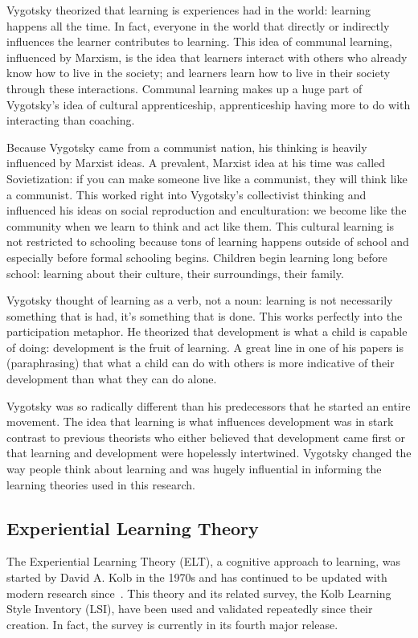 Vygotsky theorized that learning is experiences had in the world: learning happens all the time. In fact, everyone in the world that directly or indirectly influences the learner contributes to learning. This idea of communal learning, influenced by Marxism, is the idea that learners interact with others who already know how to live in the society; and learners learn how to live in their society through these interactions. Communal learning makes up a huge part of Vygotsky's idea of cultural apprenticeship, apprenticeship having more to do with interacting than coaching.

Because Vygotsky came from a communist nation, his thinking is heavily influenced by Marxist ideas. A prevalent, Marxist idea at his time was called Sovietization: if you can make someone live like a communist, they will think like a communist. This worked right into Vygotsky's collectivist thinking and influenced his ideas on social reproduction and enculturation: we become like the community when we learn to think and act like them. This cultural learning is not restricted to schooling because tons of learning happens outside of school and especially before formal schooling begins. Children begin learning long before school: learning about their culture, their surroundings, their family.

Vygotsky thought of learning as a verb, not a noun: learning is not necessarily something that is had, it's something that is done. This works perfectly into the participation metaphor. He theorized that development is what a child is capable of doing: development is the fruit of learning. A great line in one of his papers is (paraphrasing) that what a child can do with others is more indicative of their development than what they can do alone.

Vygotsky was so radically different than his predecessors that he started an entire movement. The idea that learning is what influences development was in stark contrast to previous theorists who either believed that development came first or that learning and development were hopelessly intertwined. Vygotsky changed the way people think about learning and was hugely influential in informing the learning theories used in this research.

\subsection{Experiential Learning Theory}
The Experiential Learning Theory (ELT), a cognitive approach to learning, was started by David A. Kolb in the 1970s and has continued to be updated with modern research since~\citep{kolb2005}. This theory and its related survey, the Kolb Learning Style Inventory (LSI), have been used and validated repeatedly since their creation. In fact, the survey is currently in its fourth major release.


